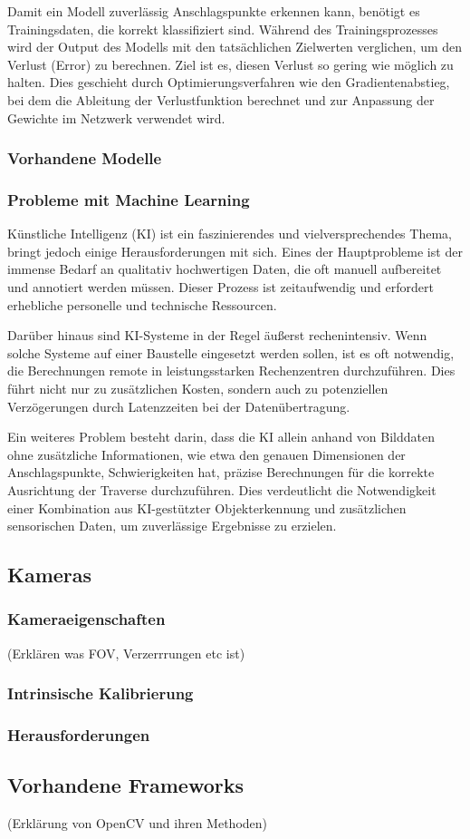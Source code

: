 Damit ein Modell zuverlässig Anschlagspunkte erkennen kann, benötigt es Trainingsdaten, die korrekt klassifiziert sind. 
Während des Trainingsprozesses wird der Output des Modells mit den tatsächlichen Zielwerten verglichen, um den Verlust (Error) 
zu berechnen. Ziel ist es, diesen Verlust so gering wie möglich zu halten. Dies geschieht durch Optimierungsverfahren wie den 
Gradientenabstieg, bei dem die Ableitung der Verlustfunktion berechnet und zur Anpassung der Gewichte im Netzwerk verwendet wird.


\subsubsection{Vorhandene Modelle}


\subsubsection{Probleme mit Machine Learning}
Künstliche Intelligenz (KI) ist ein faszinierendes und vielversprechendes Thema, bringt 
jedoch einige Herausforderungen mit sich. Eines der Hauptprobleme ist der immense Bedarf 
an qualitativ hochwertigen Daten, die oft manuell aufbereitet und annotiert werden müssen. 
Dieser Prozess ist zeitaufwendig und erfordert erhebliche personelle und technische Ressourcen.

Darüber hinaus sind KI-Systeme in der Regel äußerst rechenintensiv. Wenn solche Systeme auf
einer Baustelle eingesetzt werden sollen, ist es oft notwendig, die Berechnungen remote in 
leistungsstarken Rechenzentren durchzuführen. Dies führt nicht nur zu zusätzlichen Kosten, 
sondern auch zu potenziellen Verzögerungen durch Latenzzeiten bei der Datenübertragung.

Ein weiteres Problem besteht darin, dass die KI allein anhand von Bilddaten ohne zusätzliche 
Informationen, wie etwa den genauen Dimensionen der Anschlagspunkte, Schwierigkeiten hat, 
präzise Berechnungen für die korrekte Ausrichtung der Traverse durchzuführen.
Dies verdeutlicht die Notwendigkeit einer Kombination aus KI-gestützter Objekterkennung und 
zusätzlichen sensorischen Daten, um zuverlässige Ergebnisse zu erzielen.

\subsection{Kameras}
\subsubsection{Kameraeigenschaften}
(Erklären was FOV, Verzerrrungen etc ist)
\subsubsection{Intrinsische Kalibrierung}
\subsubsection{Herausforderungen}

\subsection{Vorhandene Frameworks}
(Erklärung von OpenCV und ihren Methoden)

